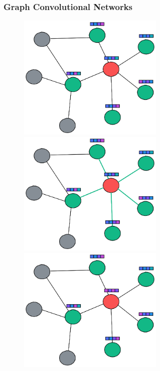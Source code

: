 \documentclass[aspectratio=169]{beamer}
\begin{document}
\begin{frame}[t]
    \frametitle{Graph Convolutional Networks}
    \begin{center}
        \begin{figure}
            \begin{overprint}
                \centering \includegraphics[width=7cm, height=6cm]{img/gnn_1.png}
                \centering \includegraphics[width=7cm, height=6cm]{img/gnn_2.png}
                \centering \includegraphics[width=7cm, height=6cm]{img/gnn_3.png}
            \end{overprint}
        \end{figure}
    \end{center}
\end{frame}
\end{document}
